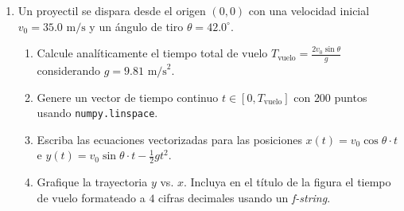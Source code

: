 \documentclass[12pt]{article}
\begin{document}
\begin{problemas}[]
\begin{enumerate}[leftmargin=*]
\begin{enumerate}[label=\alph*)]
    \item Escriba un programa que tome como entrada los valores de $A$ y $Z$, e imprima la energía de ligadura para el 
    átomo correspondiente. Use su programa para encontrar la energía de ligadura de un átomo con $A = 58$ y $Z = 28$. 
    (\textit{Sugerencia: La respuesta correcta está alrededor de $500\text{ MeV}$}).
    
    \item Modifique su programa para que imprima no la energía de ligadura total $B$, sino la energía de ligadura por nucleón, 
    la cual es $B/A$.
    
    \item Ahora modifique su programa de modo que tome como entrada únicamente el valor del número atómico $Z$ y luego 
    recorra todos los valores de $A$ desde $A = Z$ hasta $A = 3Z$, para encontrar el que tenga la mayor energía de ligadura por 
    nucleón. Este es el núcleo más estable para el número atómico dado. Haga que su programa imprima el valor de $A$ para este 
    núcleo más estable y el valor de su energía de ligadura por nucleón.
    
    \item Modifique nuevamente su programa para que, en lugar de tomar $Z$ como entrada, recorra todos los valores de $Z$ 
    desde $1$ hasta $100$ e imprima el valor más estable de $A$ para cada uno. ¿Para qué valor de $Z$ ocurre la máxima 
    energía de ligadura por nucleón? (\textit{La respuesta real en la naturaleza es $Z = 28$, correspondiente al níquel}).
\end{enumerate}

\item Un proyectil se dispara desde el origen $(0,0)$ con una velocidad inicial $v_0 = 35.0\text{ m/s}$ y un ángulo de tiro $\theta = 42.0^\circ$.
    \begin{enumerate}[label=\alph*)]
        \item Calcule analíticamente el tiempo total de vuelo $T_{\text{vuelo}} = \frac{2 v_0 \sin\theta}{g}$ considerando $g = 9.81\text{ m/s}^2$.
        \item Genere un vector de tiempo continuo $t \in [0, T_{\text{vuelo}}]$ con $200$ puntos usando \texttt{numpy.linspace}.
        \item Escriba las ecuaciones vectorizadas para las posiciones $x(t) = v_0 \cos\theta \cdot t$ e $y(t) = v_0 \sin\theta \cdot t - \frac{1}{2}g t^2$.
        \item Grafique la trayectoria $y$ vs. $x$. Incluya en el título de la figura el tiempo de vuelo formateado a $4$ cifras decimales usando un \textit{f-string}.
    \end{enumerate}


\end{enumerate}
\end{problemas}
\end{document}

